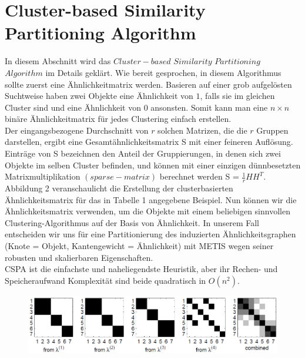 \documentclass[runningheads]{llncs}
\begin{document}
\section{Cluster-based Similarity Partitioning Algorithm}
In diesem Abschnitt wird das $Cluster-based$ $Similarity$ $Partitioning$ $Algorithm$ im Details geklärt. Wie bereit gesprochen, in diesem Algorithmus sollte zuerst eine Ähnlichkeitmatrix werden. Basieren auf einer grob aufgelösten Suchtweise haben zwei Objekte eine Ähnlichkeit von $1$, falls sie im gleichen Cluster sind und eine Ähnlichkeit von $0$ ansonsten. Somit kann man eine $n \times n$ binäre Ähnlichkeitmatrix für jedes Clustering einfach erstellen. \\
Der eingangsbezogene Durchschnitt von $r$ solchen Matrizen, die die $r$ Gruppen darstellen, ergibt eine Gesamtähnlichkeitsmatrix S mit einer feineren Auflösung. Einträge von S bezeichnen den Anteil der Gruppierungen, in denen sich zwei Objekte im selben Cluster befinden,
und können mit einer einzigen dünnbesetzten Matrixmultiplikation $(sparse- matrix)$ berechnet werden S = $\frac{1}{r} H H^{T}$. Abbildung 2 veranschaulicht die Erstellung der clusterbasierten Ähnlichkeitsmatrix für das in Tabelle 1 angegebene Beispiel. Nun können wir die Ähnlichkeitsmatrix verwenden, um die Objekte mit einem beliebigen sinnvollen
Clustering-Algorithmus auf der Basis von Ähnlichkeit. In unserem Fall entscheiden wir uns für eine Partitionierung des induzierten Ähnlichkeitsgraphen (Knote = Objekt, Kantengewicht = Ähnlichkeit) mit METIS 
wegen seiner robusten und skalierbaren Eigenschaften.\\
CSPA ist die einfachste und naheliegendste Heuristik, aber ihr Rechen- und Speicheraufwand
Komplexität sind beide quadratisch in $O(n^2)$.
\begin{figure}[t]
	\includegraphics[width=\textwidth]{Abbildung2}
\end{figure}


\end{document}
